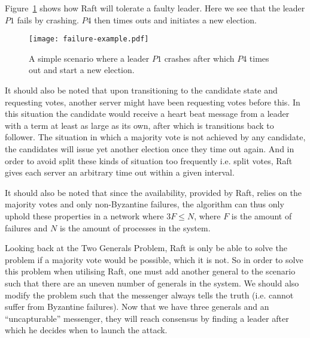 Figure~\ref{fig:failure_example} shows how Raft will tolerate a faulty leader. Here we see that the leader $P1$ fails by crashing. $P4$ then times outs and initiates a new election.

\begin{figure}[ht!]
\centering
\texttt{[image: failure-example.pdf]}
\caption{A simple scenario where a leader $P1$ crashes after which $P4$ times out and start a new election.}
\label{fig:failure_example}
\end{figure}

It should also be noted that upon transitioning to the candidate state and requesting votes, another server might have been requesting votes before this. In this situation the candidate would receive a heart beat message from a leader with a term at least as large as its own, after which is transitions back to follower.
The situation in which a majority vote is not achieved by any candidate, the candidates will issue yet another election once they time out again. And in order to avoid split these kinds of situation too frequently i.e. split votes, Raft gives each server an arbitrary time out within a given interval.

It should also be noted that since the availability, provided by Raft, relies on the majority votes and only non-Byzantine failures, the algorithm can thus only uphold these properties in a network where $3F \leq N$, where $F$ is the amount of failures and $N$ is the amount of processes in the system.~\cite{Fischer}

Looking back at the Two Generals Problem, Raft is only be able to solve the problem if a majority vote would be possible, which it is not. So in order to solve this problem when utilising Raft, one must add another general to the scenario such that there are an uneven number of generals in the system. We should also modify the problem such that the messenger always tells the truth (i.e. cannot suffer from Byzantine failures). Now that we have three generals and an ``uncapturable'' messenger, they will reach consensus by finding a leader after which he decides when to launch the attack.

